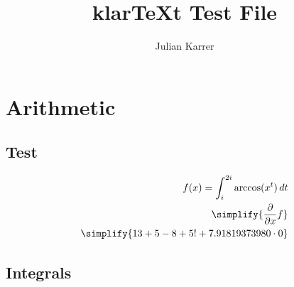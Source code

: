 \documentclass[oneside, a4paper]{article}
\author{Julian Karrer}
\title{klarTeXt Test File}
\begin{document}
\maketitle

\section*{Arithmetic}

\subsection*{Test}
\begin{program}
    \begin{align*}
        f(x) = \int_{i}^{2i} \arccos(x^t)\,dt \\
        \simplify{\ddx{x} f}\\
        \simplify{13+5-8+5!+7.91819373980\cdot 0}\\
    \end{align*}
\end{program}

\subsection*{Integrals}


\end{document}
